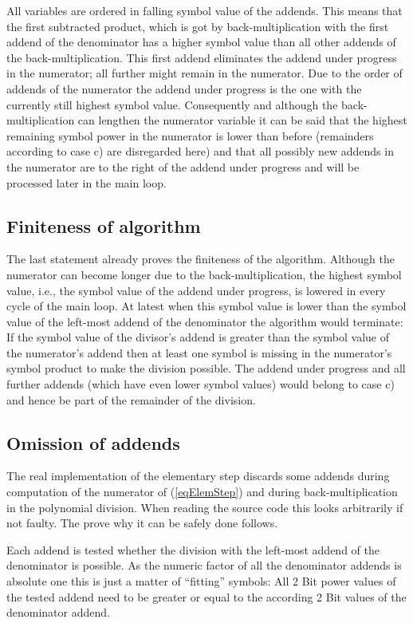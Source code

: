 All variables are ordered in falling symbol value of the addends. This
means that the first subtracted product, which is got by
back-multiplication with the first addend of the denominator has a higher
symbol value than all other addends of the back-multiplication. This first
addend eliminates the addend under progress in the numerator; all further
might remain in the numerator. Due to the order of addends of the
numerator the addend under progress is the one with the currently still
highest symbol value. Consequently and although the back-multiplication
can lengthen the numerator variable it can be said that the highest
remaining symbol power in the numerator is lower than before (remainders
according to case c) are disregarded here) and that all possibly new
addends in the numerator are to the right of the addend under progress and
will be processed later in the main loop.


\subsection{Finiteness of algorithm}

The last statement already proves the finiteness of the algorithm.
Although the numerator can become longer due to the back-multiplication,
the highest symbol value, i.e., the symbol value of the addend under
progress, is lowered in every cycle of the main loop. At latest when this
symbol value is lower than the symbol value of the left-most addend of the
denominator the algorithm would terminate: If the symbol value of the
divisor's addend is greater than the symbol value of the numerator's
addend then at least one symbol is missing in the numerator's symbol
product to make the division possible. The addend under progress and all
further addends (which have even lower symbol values) would belong to case
c) and hence be part of the remainder of the division.


\subsection{Omission of addends}

The real implementation of the elementary step discards some addends during
computation of the numerator of (\ref{eqElemStep}) and during
back-multiplication in the polynomial division. When reading the source
code this looks arbitrarily if not faulty. The prove why it can be
safely done follows.

Each addend is tested whether the division with the left-most addend of the
denominator is possible. As the numeric factor of all the denominator
addends is absolute one this is just a matter of ``fitting'' symbols: All 2
Bit power values of the tested addend need to be greater or equal to the
according 2 Bit values of the denominator addend.

